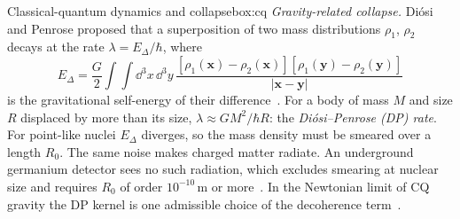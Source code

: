\begin{primer}{Classical-quantum dynamics and collapse}{box:cq}
\emph{Gravity-related collapse.} Di\'osi and Penrose proposed that a superposition of two mass distributions $\rho_1$, $\rho_2$ decays at
the rate $\lambda=E_\Delta/\hbar$, where
\[
E_\Delta=\frac G2\int\!\!\int\dd^3x\,\dd^3y\,\frac{[\rho_1(\mathbf x)-\rho_2(\mathbf x)][\rho_1(\mathbf y)-\rho_2(\mathbf y)]}
{|\mathbf x-\mathbf y|}
\]
is the gravitational self-energy of their difference~\cite{diosi87,penrose96,bassi2013}. For a body of mass $M$ and size $R$ displaced by
more than its size, $\lambda\approx GM^2/\hbar R$: the \emph{Di\'osi--Penrose (DP) rate}. For point-like nuclei $E_\Delta$ diverges, so the
mass density must be smeared over a length $R_0$. The same noise makes charged matter radiate. An underground germanium detector sees no
such radiation, which excludes smearing at nuclear size and requires $R_0$ of order $10^{-10}$\,m or more~\cite{donadi,figurato}. In the
Newtonian limit of CQ gravity the DP kernel is one admissible choice of the decoherence term~\cite{osswd}.
\end{primer}
